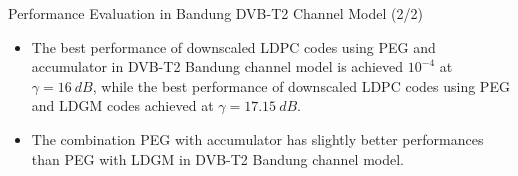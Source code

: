 \documentclass[11pt, aspectratio=169]{beamer}
\begin{document}
\begin{frame}{Performance Evaluation in Bandung DVB-T2 Channel Model (2/2)}
\begin{figure}
\begin{minipage}{.5\linewidth}
			\vspace{-0.5cm}
		\end{minipage}
		\hfill
		\label{gambar: awgnhasil}
	\end{figure}
	
	\begin{itemize}
		\item \small
		The best performance of downscaled LDPC codes using PEG and accumulator in DVB-T2 Bandung channel model is achieved $10^{-4}$ at $\gamma = 16~dB$, while the best performance of downscaled LDPC codes using PEG and LDGM codes achieved at $\gamma = 17.15~dB$.
		\item The combination PEG with accumulator  has slightly better performances than PEG with LDGM in DVB-T2 Bandung channel model.
	\end{itemize}
	
\end{frame}

\end{document}
